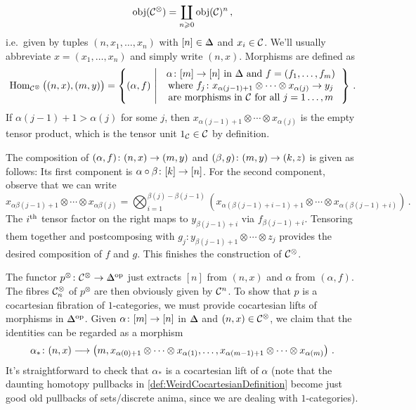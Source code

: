 \documentclass[a4paper, 10pt, oneside, DIV=9, chapterprefix=true, numbers=enddot,bibliography=totoc]{scrbook}
\begin{document}
\begin{exm}
\begin{alphanumerate}
		\begin{equation*}
			\operatorname{obj}(\mathcal{C}^\otimes)=\coprod_{n\geqslant 0}\operatorname{obj}(\mathcal{C})^n\,,
		\end{equation*}
		i.e.\ given by tuples $(n, x_1,\dotsc,x_n)$ with $[n]\in \IDelta$ and $x_i\in \mathcal{C}$. We'll usually abbreviate $x=(x_1,\dotsc,x_n)$ and simply write $(n,x)$. Morphisms are defined as
		\begin{equation*}
			\Hom_{\Cc^\otimes}\big((n,x),(m,y)\big)=\left\{(\alpha,f)\st \begin{tabular}{c}
				$\alpha\colon [m]\rightarrow [n]$ in $\IDelta$ and $f=(f_1,\dotsc,f_m)$\\
				where $f_j\colon x_{\alpha(j-1)+1}\otimes\dotsb\otimes x_{\alpha(j)}\rightarrow y_j$\\
				are morphisms in $\Cc$ for all $j=1\dotsc,m$
			\end{tabular}\right\}\,.
		\end{equation*}
		If $\alpha(j-1)+1>\alpha(j)$ for some $j$, then $x_{\alpha(j-1)+1}\otimes\dotsb\otimes x_{\alpha(j)}$ is the empty tensor product, which is the tensor unit $1_{\mathcal{C}}\in\mathcal{C}$ by definition.
		
		The composition of $(\alpha,f)\colon(n,x)\morphism (m,y)$ and $(\beta,g)\colon (m,y)\morphism (k,z)$ is given as follows: Its first component is $\alpha\circ\beta\colon [k]\morphism{[n]}$. For the second component, observe that we can write
		\begin{equation*}
			x_{\alpha\beta(j-1)+1}\otimes \dotsb \otimes x_{\alpha\beta(j)}=\bigotimes_{i=1}^{\beta(j)-\beta(j-1)}\left(x_{\alpha(\beta(j-1)+i-1)+1}\otimes\dotsb\otimes x_{\alpha(\beta(j-1)+i)}\right)\,.
		\end{equation*}
		The $i^{\text{th}}$ tensor factor on the right maps to $y_{\beta(j-1)+i}$ via $f_{\beta(j-1)+i}$. Tensoring them together and postcomposing with $g_j\colon y_{\beta(j-1)+1}\otimes\dotsb\otimes z_j$ provides the desired composition of $f$ and $g$. This finishes the construction of $\mathcal{C}^\otimes$.
		
		The functor $p^\otimes\colon \Cc^\otimes\morphism\IDelta^\op$ just extracts $[n]$ from $(n,x)$ and $\alpha$ from $(\alpha,f)$. The fibres $\mathcal{C}_n^\otimes$ of $p^\otimes$ are then obviously given by $\mathcal{C}^n$. To show that $p$ is a cocartesian fibration of $1$-categories, we must provide cocartesian lifts of morphisms in $\IDelta^\op$. Given $\alpha\colon [m]\morphism {}[n]$ in $\IDelta$ and $(n,x)\in \mathcal{C}^\otimes$, we claim that the identities can be regarded as a morphism
		\begin{equation*}
			\alpha_*\colon (n,x)\morphism \left(m,x_{\alpha(0)+1}\otimes\dotsb\otimes x_{\alpha(1)},\dotsc,x_{\alpha(m-1)+1}\otimes\dotsb\otimes x_{\alpha(m)}\right)\,.
		\end{equation*}
		It's straightforward to check that $\alpha_*$ is a cocartesian lift of $\alpha$ (note that the daunting homotopy pullbacks in \cref{def:WeirdCocartesianDefinition} become just good old pullbacks of sets/discrete anima, since we are dealing with $1$-categories).
		

\end{alphanumerate}
\end{exm}
\end{document}

